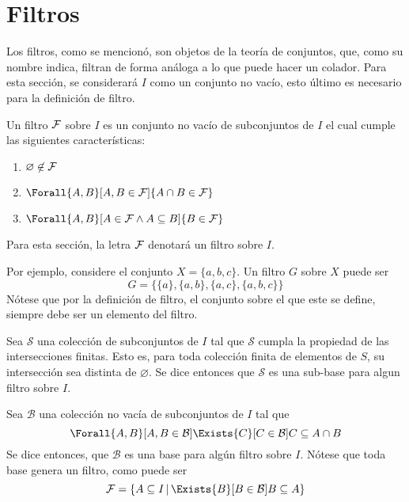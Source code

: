 \section{Filtros}

Los filtros, como se mencionó, son objetos de la teoría de conjuntos,
que, como su nombre indica, filtran de forma análoga a lo que
puede hacer un colador. Para esta sección, se considerará $I$ como un
conjunto no vacío, esto último es necesario para la definición de filtro.

\begin{definition}\label{def:filtro}
  Un filtro $\mathcal{F}$ sobre $I$ es un conjunto no vacío de subconjuntos de $I$
  el cual cumple las siguientes características:
  \begin{enumerate}
    \item $\varnothing \not\in \mathcal{F}$
    \item $\Forall{A,B}[A,B \in \F]{A\cap B \in \F}$
    \item $\Forall{A,B}[A\in \F \land A \subseteq B]{B \in \F}$
  \end{enumerate}

  Para esta sección, la letra $\mathcal{F}$ denotará un filtro sobre $I$.
\end{definition}

Por ejemplo, considere el conjunto $X=\{a,b,c\}$. Un filtro $G$ sobre $X$
puede ser 
\[G = \{\{a\}, \{a,b\}, \{a,c\}, \{a,b,c\}\}\]
Nótese que por la definición de filtro, el conjunto sobre el que este se
define, siempre debe ser un elemento del filtro.

\begin{definition}
  Sea $\mathcal{S}$ una colección de subconjuntos de $I$ tal que
  $\mathcal{S}$ cumpla la propiedad de las intersecciones finitas. Esto es,
  para toda colección finita de elementos de $S$, su intersección sea
  distinta de $\varnothing$. Se dice entonces que $\mathcal{S}$ es una
  sub-base para algun filtro sobre $I$.
\end{definition}

\begin{definition}
  Sea $\mathcal{B}$ una colección no vacía de subconjuntos de $I$ tal
  que
  \[
    \Forall{A,B}[A,B \in \mathcal{B}]{
      \Exists{C}[C\in\mathcal{B}]{C \subseteq A \cap B}
      }
  \]
  Se dice entonces, que $\mathcal{B}$ es una base para algún filtro sobre $I$.
  Nótese que toda base genera un filtro, como puede ser
  \[\F = \{A \subseteq I \,|\, \Exists{B}[B\in\mathcal{B}]{B\subseteq A}\}\]
\end{definition}

